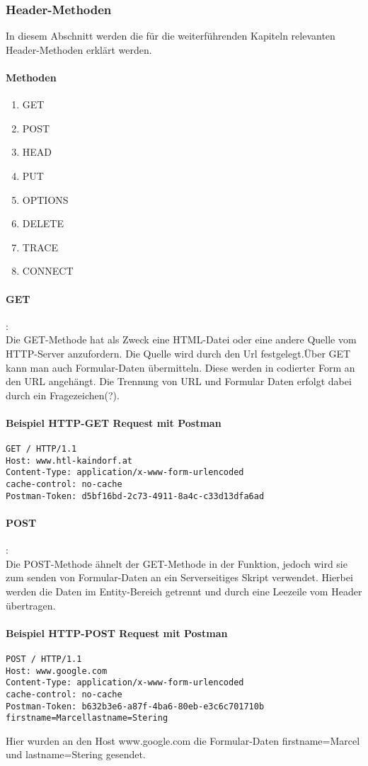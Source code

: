 \subsubsection{Header-Methoden}
In diesem Abschnitt werden die für die weiterführenden Kapiteln relevanten Header-Methoden erklärt werden.
\paragraph{Methoden}
\begin{enumerate}
\item GET
\item POST
\item HEAD
\item PUT
\item OPTIONS
\item DELETE
\item TRACE
\item CONNECT
\end{enumerate}
\paragraph{GET}:\\Die GET-Methode hat als Zweck eine HTML-Datei oder eine andere Quelle vom HTTP-Server anzufordern. Die Quelle wird durch den Url festgelegt.Über GET kann man auch Formular-Daten übermitteln. Diese werden in codierter Form an den URL angehängt. Die Trennung von URL und Formular Daten erfolgt dabei durch ein Fragezeichen(?).
\paragraph{Beispiel HTTP-GET Request mit Postman}
\begin{lstlisting}
GET / HTTP/1.1
Host: www.htl-kaindorf.at
Content-Type: application/x-www-form-urlencoded
cache-control: no-cache
Postman-Token: d5bf16bd-2c73-4911-8a4c-c33d13dfa6ad
\end{lstlisting}
\paragraph{POST}:\\Die POST-Methode ähnelt der GET-Methode in der Funktion, jedoch wird sie zum senden von Formular-Daten an ein Serverseitiges Skript verwendet. Hierbei werden die Daten im Entity-Bereich getrennt und durch eine Leezeile vom Header übertragen.
\paragraph{Beispiel HTTP-POST Request mit Postman}
\begin{lstlisting}
POST / HTTP/1.1
Host: www.google.com
Content-Type: application/x-www-form-urlencoded
cache-control: no-cache
Postman-Token: b632b3e6-a87f-4ba6-80eb-e3c6c701710b
firstname=Marcellastname=Stering
\end{lstlisting}
Hier wurden an den Host www.google.com die Formular-Daten firstname=Marcel und lastname=Stering gesendet.

